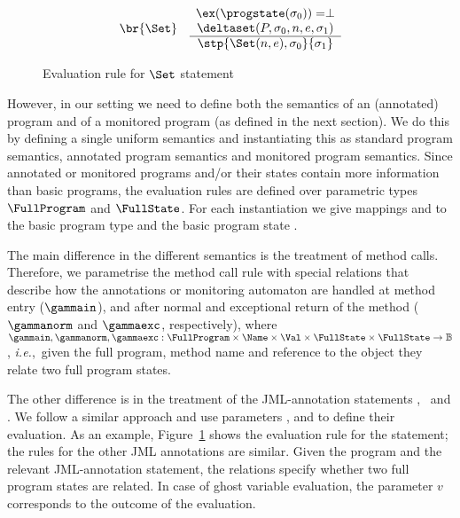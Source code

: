 \begin{figure}[t]
\[\begin{array}{c}
\begin{array}{lc}
\br{\Set}     &
\begin{array}{c}
\ex(\progstate(\sigma_0)) = \perp\\
\deltaset(P, \sigma_0, n, e, \sigma_1)\\
\hline
\stp{\Set(n, e), \sigma_0}{\sigma_1}
\end{array}
\end{array}

\end{array}
\]
\caption{Evaluation rule for \(\Set\) statement}\label{FigEvalRules}
\end{figure}

However, in our setting we need to define both the semantics of an
(annotated) program and of a monitored program (as defined in the next
section). We do this by defining a single uniform semantics and
instantiating this as standard program semantics, annotated program
semantics and monitored program semantics. Since annotated or
monitored programs and/or their states contain more information than
basic programs, the evaluation rules are defined over parametric types
\(\FullProgram\) and \(\FullState\). For each instantiation we give
mappings \program and \progstate to the basic program type \Program
and the basic program state \Pstate.

The main difference in the different semantics is the treatment of
method calls. Therefore, we parametrise the method call rule with
special relations that describe how the annotations or monitoring
automaton are handled at method entry (\(\gammain\)), and after normal
and exceptional return of the method (\(\gammanorm\) and
\(\gammaexc\), respectively), where \(\gammain, \gammanorm, \gammaexc
: \FullProgram
\times \Name \times \Val \times \FullState \times \FullState \rightarrow
\mathbb{B}\), \emph{i.e.},~given the full program, method
name and reference to the object they relate two full program states. 

The other difference is in the treatment of the JML-annotation
statements \Set, \EvalG\ and \CaseJML. We follow a similar approach and
use parameters \deltaset, \deltaeval and \deltacase to define their
evaluation. As an example, Figure~\ref{FigEvalRules} shows the
evaluation rule for the \Set statement; the rules for the other JML
annotations are similar. Given the program and the relevant
JML-annotation statement, the relations specify whether two full
program states are related. In case of ghost variable evaluation, the
parameter \(v\) corresponds to the outcome of the evaluation.

